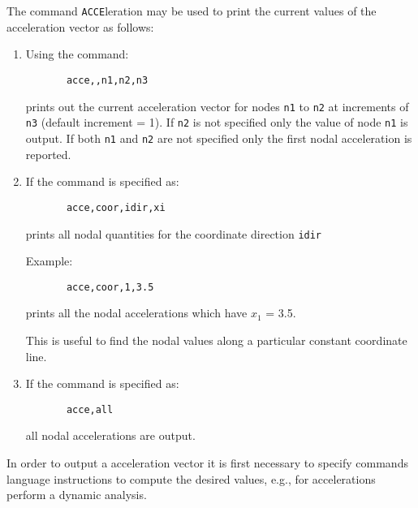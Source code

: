 \\{\smallskip}
\\{\smallskip}
\headb

The command {\tt ACCE}leration may be used to print the
current values of the acceleration vector as follows:

\begin{enumerate}
\item{
Using the command:
\begin{verbatim}
       acce,,n1,n2,n3
\end{verbatim}
prints out the current acceleration vector for nodes
{\tt n1} to {\tt n2} at increments of {\tt n3} (default increment = 1).  If
{\tt n2} is not specified only the value of node {\tt n1} is
output.  If both {\tt n1} and {\tt n2} are not specified only
the first nodal acceleration is reported.}

\item{
If the command is specified as:

\begin{verbatim}
       acce,coor,idir,xi
\end{verbatim}
prints all nodal quantities for the coordinate direction {\tt idir}

Example:
\begin{verbatim}
       acce,coor,1,3.5
\end{verbatim}
prints all the nodal accelerations which have $x_1$ = 3.5.

This is useful to find the nodal values along a particular
constant coordinate line.}

\item{
If the command is specified as:
\begin{verbatim}
       acce,all
\end{verbatim}
all nodal accelerations are output.}
\end{enumerate}

In order to output a acceleration vector it is first necessary to
specify commands language instructions to compute the desired
values, e.g., for accelerations perform a dynamic analysis.
\vfill\eject
